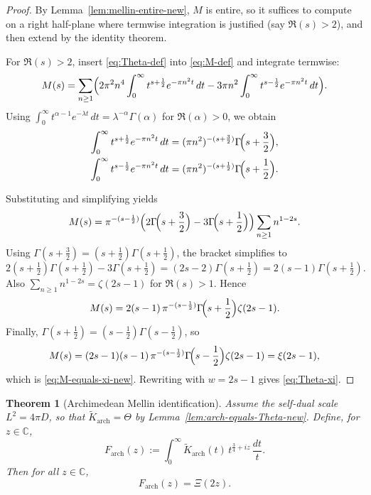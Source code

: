 \documentclass[12pt]{amsart}
\newtheorem{theorem}{Theorem}[section]
\theoremstyle{definition}
\theoremstyle{remark}
\begin{document}
\begin{proof}
By Lemma~\ref{lem:mellin-entire-new}, $M$ is entire, so it suffices to compute on a right half-plane
where termwise integration is justified (say $\Re(s)>2$), and then extend by the identity theorem.

For $\Re(s)>2$, insert \eqref{eq:Theta-def} into \eqref{eq:M-def} and integrate termwise:
\[
M(s)
=
\sum_{n\ge 1}\Bigl(
2\pi^2 n^4 \int_0^\infty t^{s+\frac12}e^{-\pi n^2 t}\,dt
-
3\pi n^2 \int_0^\infty t^{s-\frac12}e^{-\pi n^2 t}\,dt
\Bigr).
\]
Using $\int_0^\infty t^{\alpha-1}e^{-\lambda t}\,dt=\lambda^{-\alpha}\Gamma(\alpha)$ for $\Re(\alpha)>0$,
we obtain
\begin{align*}
\int_0^\infty t^{s+\frac12}e^{-\pi n^2 t}\,dt
&= (\pi n^2)^{-(s+\frac32)}\Gamma\!\Bigl(s+\frac32\Bigr), \\
\int_0^\infty t^{s-\frac12}e^{-\pi n^2 t}\,dt
&= (\pi n^2)^{-(s+\frac12)}\Gamma\!\Bigl(s+\frac12\Bigr).
\end{align*}

Substituting and simplifying yields
\[
M(s)
=
\pi^{-(s-\frac12)}\Bigl(2\Gamma\!\Bigl(s+\frac32\Bigr)-3\Gamma\!\Bigl(s+\frac12\Bigr)\Bigr)
\sum_{n\ge 1} n^{1-2s}.
\]
Using $\Gamma(s+\frac32)=(s+\frac12)\Gamma(s+\frac12)$, the bracket simplifies to
\[
2(s+\tfrac12)\Gamma(s+\tfrac12)-3\Gamma(s+\tfrac12)=(2s-2)\Gamma(s+\tfrac12)=2(s-1)\Gamma(s+\tfrac12).
\]
Also $\sum_{n\ge 1}n^{1-2s}=\zeta(2s-1)$ for $\Re(s)>1$. Hence
\[
M(s)
=
2(s-1)\,\pi^{-(s-\frac12)}\Gamma\!\Bigl(s+\frac12\Bigr)\zeta(2s-1).
\]
Finally, $\Gamma(s+\tfrac12)=(s-\tfrac12)\Gamma(s-\tfrac12)$, so
\[
M(s)
=
(2s-1)(s-1)\,\pi^{-(s-\frac12)}\Gamma\!\Bigl(s-\frac12\Bigr)\zeta(2s-1)
=
\xi(2s-1),
\]
which is \eqref{eq:M-equals-xi-new}. Rewriting with $w=2s-1$ gives \eqref{eq:Theta-xi}.
\end{proof}

\begin{theorem}[Archimedean Mellin identification]
\label{thm:arch-mellin-identification}
Assume the self-dual scale $L^2=4\pi D$, so that $\widetilde K_{\mathrm{arch}}=\Theta$
by Lemma~\ref{lem:arch-equals-Theta-new}.
Define, for $z\in\mathbb C$,
\begin{equation}
\label{eq:Farch-def-new}
F_{\mathrm{arch}}(z)
:=
\int_0^\infty \widetilde K_{\mathrm{arch}}(t)\,t^{\frac34+iz}\,\frac{dt}{t}.
\end{equation}
Then for all $z\in\mathbb C$,
\begin{equation}
\label{eq:Farch-equals-Xi}
F_{\mathrm{arch}}(z)=\Xi(2z).
\end{equation}
\end{theorem}
\end{document}
